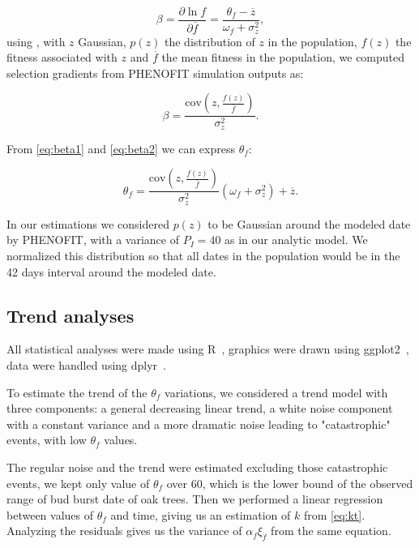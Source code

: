 \begin{equation}
	\label{eq:beta1}
	\beta = \frac{\partial \ln f}{\partial \overline{f}} = \frac{\theta_f - \overline{z}}{\omega_f + \sigma_z^2},
\end{equation}
using \citep{lande_measurement_1983}, with $z$ Gaussian, $p(z)$ the distribution of $z$ in the population, $f(z)$ the fitness associated with $z$ and $\overline{f}$ the mean fitness in the population, we computed selection gradients from PHENOFIT simulation outputs as:

\begin{equation}
	\label{eq:beta2}
	\beta = \frac{\text{cov}(z, \frac{f(z)}{\overline{f}})}{\sigma_z^2}.
\end{equation}

From \eqref{eq:beta1} and \eqref{eq:beta2} we can express $\theta_f$:

\begin{equation}
	\theta_f = \frac{\text{cov}(z, \frac{f(z)}{\overline{f}})}{\sigma_z^2} (\omega_f + \sigma_z^2) + \overline{z}.
\end{equation}

In our estimations we considered $p(z)$ to be Gaussian around the modeled date by \textsc{PHENOFIT}, with a variance of $P_I=40$ as in our analytic model. We normalized this distribution so that all dates in the population would be in the 42 days interval around the modeled date.

\subsection*{Trend analyses}

All statistical analyses were made using R~\citep{R_2014}, graphics were drawn using ggplot2~\citep{ggplot2_2009}, data were handled using dplyr~\citep{dplyr_2014}.

To estimate the trend of the $\theta_f$ variations, we considered a trend model with three components: a general decreasing linear trend, a white noise component with a constant variance and a more dramatic noise leading to "catastrophic" events, with low $\theta_f$ values.

The regular noise and the trend were estimated excluding those catastrophic events, we kept only value of $\theta_f$ over 60, which is the lower bound of the observed range of bud burst date of oak trees. Then we performed a linear regression between values of $\theta_f$ and time, giving us an estimation of $k$ from \autoref{eq:kt}. Analyzing the residuals gives us the variance of $\alpha_f \xi_f$ from the same equation.

